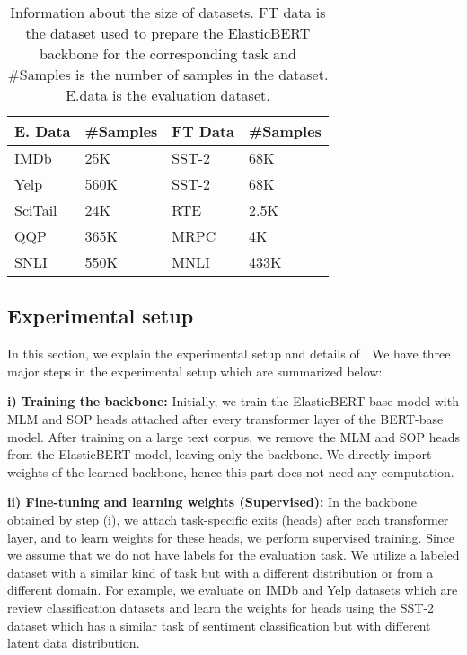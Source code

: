 \begin{table}
\caption{Information about the size of datasets. FT data is the dataset used to prepare the ElasticBERT backbone for the corresponding task and \#Samples is the number of samples in the dataset. E.data is the evaluation dataset.}
\begin{tabular}{|l|l|l|l|}
\hline
\textbf{E. Data} & \textbf{\#Samples} & \textbf{FT Data} & \textbf{\#Samples} \\ \hline
IMDb             & 25K                & SST-2            & 68K                \\ \hline
Yelp             & 560K               & SST-2            & 68K                \\ \hline
SciTail          & 24K                & RTE              & 2.5K               \\ \hline
QQP              & 365K               & MRPC             & 4K                 \\ \hline
SNLI             & 550K               & MNLI             & 433K               \\ \hline
\end{tabular}

\label{tab: dataset} 
\end{table}



\subsection{Experimental setup}\label{sec: exp_setup}
In this section, we explain the experimental setup and details of \our{}.
We have three major steps in the experimental setup which are summarized below:

\textbf{i) Training the backbone:} Initially, we train the ElasticBERT-base model with MLM and SOP heads attached after every transformer layer of the BERT-base model. After training on a large text corpus, we remove the MLM and SOP heads from the ElasticBERT model, leaving only the backbone. We directly import weights of the learned backbone, hence this part does not need any computation.

\textbf{ii) Fine-tuning and learning weights (Supervised):} In the backbone obtained by step (i), we attach task-specific exits (heads) after each transformer layer, and to learn weights for these heads, we perform supervised training. Since we assume that we do not have labels for the evaluation task. We utilize a labeled dataset with a similar kind of task but with a different distribution or from a different domain. For example, we evaluate \our{} on IMDb and Yelp datasets which are review classification datasets and learn the weights for heads using the SST-2 dataset which has a similar task of sentiment classification but with different latent data distribution. 

